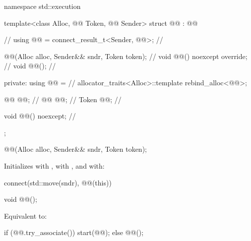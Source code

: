 %
\begin{codeblock}
namespace std::execution {
  template<class Alloc, @@ Token, @@ Sender>
  struct @@ : @@ {                   // \expos
    using @@ = connect_result_t<Sender, @@>;  // \expos

    @@(Alloc alloc, Sender&& sndr, Token token);   // \expos
    void @@() noexcept override;                      // \expos
    void @@();                                             // \expos

  private:
    using @@ =                                         // \expos
      allocator_traits<Alloc>::template rebind_alloc<@@>;

    @@ @@;                                          // \expos
    @@ @@;                                                // \expos
    Token @@;                                            // \expos

    void @@() noexcept;                                // \expos
  };
}
\end{codeblock}

%
\begin{itemdecl}
@@(Alloc alloc, Sender&& sndr, Token token);
\end{itemdecl}

\begin{itemdescr}
\pnum
\effects
Initializes
 with ,
 with , and
 with:
\begin{codeblock}
connect(std::move(sndr), @@(this))
\end{codeblock}
\end{itemdescr}

%
\begin{itemdecl}
void @@();
\end{itemdecl}

\begin{itemdescr}
\pnum
\effects
Equivalent to:
\begin{codeblock}
if (@@.try_associate())
  start(@@);
else
  @@();
\end{codeblock}
\end{itemdescr}

